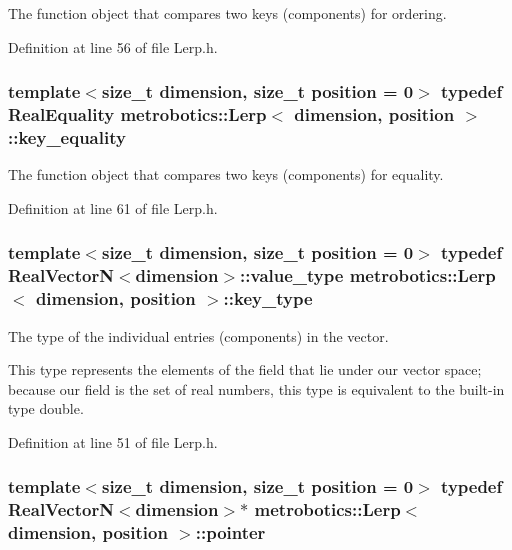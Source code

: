 \-The function object that compares two keys (components) for ordering. 



\-Definition at line 56 of file \-Lerp.\-h.

\hypertarget{classmetrobotics_1_1Lerp_ae164917b993d09546ee1dff125cc7847}{
\subsubsection[{key\-\_\-equality}]{\setlength{\rightskip}{0pt plus 5cm}template$<$size\-\_\-t dimension, size\-\_\-t position = 0$>$ typedef {\bf \-Real\-Equality} {\bf metrobotics\-::\-Lerp}$<$ dimension, position $>$\-::{\bf key\-\_\-equality}}}\label{classmetrobotics_1_1Lerp_ae164917b993d09546ee1dff125cc7847}


\-The function object that compares two keys (components) for equality. 



\-Definition at line 61 of file \-Lerp.\-h.

\hypertarget{classmetrobotics_1_1Lerp_a3cd6f9215623083b5ed90f4c03ac6dc7}{
\subsubsection[{key\-\_\-type}]{\setlength{\rightskip}{0pt plus 5cm}template$<$size\-\_\-t dimension, size\-\_\-t position = 0$>$ typedef {\bf \-Real\-Vector\-N}$<$dimension$>$\-::{\bf value\-\_\-type} {\bf metrobotics\-::\-Lerp}$<$ dimension, position $>$\-::{\bf key\-\_\-type}}}\label{classmetrobotics_1_1Lerp_a3cd6f9215623083b5ed90f4c03ac6dc7}


\-The type of the individual entries (components) in the vector. 

\-This type represents the elements of the field that lie under our vector space; because our field is the set of real numbers, this type is equivalent to the built-\/in type {\ttfamily double}. 

\-Definition at line 51 of file \-Lerp.\-h.

\hypertarget{classmetrobotics_1_1Lerp_a77fb99f54e951d0e63c43e3249719e97}{
\subsubsection[{pointer}]{\setlength{\rightskip}{0pt plus 5cm}template$<$size\-\_\-t dimension, size\-\_\-t position = 0$>$ typedef {\bf \-Real\-Vector\-N}$<$dimension$>$$\ast$ {\bf metrobotics\-::\-Lerp}$<$ dimension, position $>$\-::{\bf pointer}}}\label{classmetrobotics_1_1Lerp_a77fb99f54e951d0e63c43e3249719e97}


